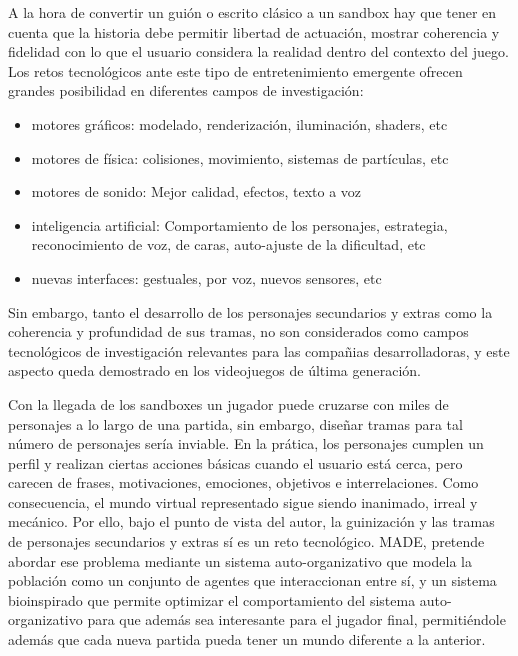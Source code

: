 A la hora de convertir un guión o escrito clásico a un sandbox hay que tener en cuenta que la historia debe permitir libertad de actuación, mostrar coherencia y fidelidad con lo que el usuario considera la realidad dentro del contexto del juego. Los retos tecnológicos ante este tipo de entretenimiento emergente ofrecen grandes posibilidad en diferentes campos de investigación:

\begin{itemize}
\item motores gráficos: modelado, renderización, iluminación, shaders, etc
\item motores de física: colisiones, movimiento, sistemas de partículas, etc
\item motores de sonido: Mejor calidad, efectos, texto a voz
\item inteligencia artificial: Comportamiento de los personajes, estrategia, reconocimiento de voz, de caras, auto-ajuste de la dificultad, etc
\item nuevas interfaces: gestuales, por voz, nuevos sensores, etc
\end{itemize}

Sin embargo, tanto el desarrollo de los personajes secundarios y extras como la coherencia y profundidad de sus tramas, no son considerados como campos tecnológicos de investigación relevantes para las compañias desarrolladoras, y este aspecto queda demostrado en los videojuegos de última generación.

Con la llegada de los sandboxes un jugador puede cruzarse con miles de personajes a lo largo de una partida, sin embargo, diseñar tramas para tal número de personajes sería inviable. En la prática, los personajes cumplen un perfil y realizan ciertas acciones básicas cuando el usuario está cerca, pero carecen de frases, motivaciones, emociones, objetivos e interrelaciones. Como consecuencia, el mundo virtual representado sigue siendo inanimado, irreal y mecánico. Por ello, bajo el punto de vista del autor, la guinización y las tramas de personajes secundarios y extras sí es un reto tecnológico. MADE, pretende abordar ese problema mediante un sistema auto-organizativo que modela la población como un conjunto de agentes que interaccionan entre sí, y un sistema bioinspirado que permite optimizar el comportamiento del sistema auto-organizativo para que además sea interesante para el jugador final, permitiéndole además que cada nueva partida pueda tener un mundo diferente a la anterior.





